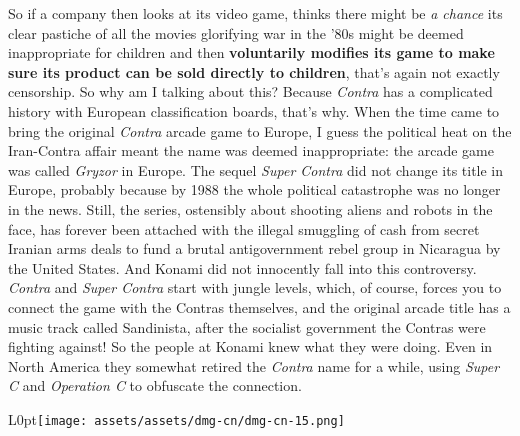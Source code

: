 \documentclass{book}
\begin{document}
\begin{minipage}{0.45\linewidth}\end{minipage}\vspace{2pt}
\begin{minipage}{0.45\linewidth}\end{minipage}
\par\justifying
So if a company then looks at its video game, thinks there might be \emph{a chance} its clear pastiche of all the movies glorifying war in the ’80s might be deemed inappropriate for children and then \textbf{voluntarily modifies its game to make sure its product can be sold directly to children}, that’s again not exactly censorship. So why am I talking about this? Because \emph{Contra} has a complicated history with European classification boards, that’s why. When the time came to bring the original \emph{Contra} arcade game to Europe, I guess the political heat on the Iran-Contra affair meant the name was deemed inappropriate: the arcade game was called \emph{Gryzor} in Europe. The sequel \emph{Super Contra} did not change its title in Europe, probably because by 1988 the whole political catastrophe was no longer in the news. Still, the series, ostensibly about shooting aliens and robots in the face, has forever been attached with the illegal smuggling of cash from secret Iranian arms deals to fund a brutal antigovernment rebel group in Nicaragua by the United States. And Konami did not innocently fall into this controversy. \emph{Contra} and \emph{Super Contra} start with jungle levels, which, of course, forces you to connect the game with the Contras themselves, and the original arcade title has a music track called Sandinista, after the socialist government the Contras were fighting against! So the people at Konami knew what they were doing. Even in North America they somewhat retired the \emph{Contra} name for a while, using \emph{Super C} and \emph{Operation C} to obfuscate the connection.\par
\begin{wrapfigure}{L}{0pt}{\texttt{[image: assets/assets/dmg-cn/dmg-cn-15.png]}}\end{wrapfigure}\noindent
\end{document}
